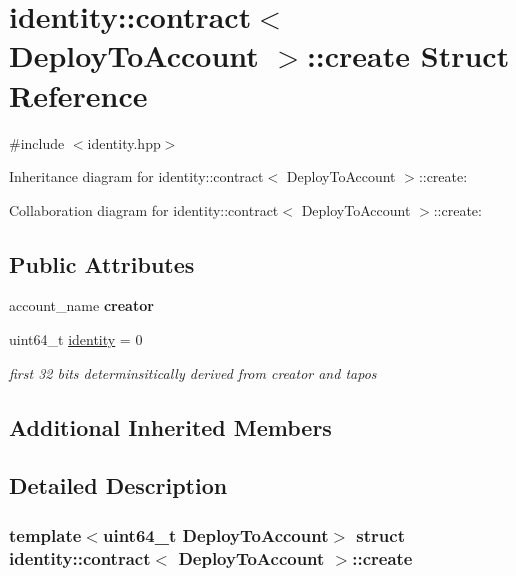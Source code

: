 \hypertarget{structidentity_1_1contract_1_1create}{}\section{identity\+:\+:contract$<$ Deploy\+To\+Account $>$\+:\+:create Struct Reference}
\label{structidentity_1_1contract_1_1create}


{\ttfamily \#include $<$identity.\+hpp$>$}



Inheritance diagram for identity\+:\+:contract$<$ Deploy\+To\+Account $>$\+:\+:create\+:


Collaboration diagram for identity\+:\+:contract$<$ Deploy\+To\+Account $>$\+:\+:create\+:
\subsection*{Public Attributes}
\begin{DoxyCompactItemize}
\item 
\mbox{\label{structidentity_1_1contract_1_1create_a7ab51fa09f57b794a8d08be27e3fba4e}} 
account\+\_\+name {\bfseries creator}
\item 
\mbox{\label{structidentity_1_1contract_1_1create_ad3eed7947aada76a30a9c9a3fe3b8c81}} 
uint64\+\_\+t \mbox{\hyperlink{structidentity_1_1contract_1_1create_ad3eed7947aada76a30a9c9a3fe3b8c81}{identity}} = 0
\begin{DoxyCompactList}\small\item\em first 32 bits determinsitically derived from creator and tapos \end{DoxyCompactList}\end{DoxyCompactItemize}
\subsection*{Additional Inherited Members}


\subsection{Detailed Description}
\subsubsection*{template$<$uint64\+\_\+t Deploy\+To\+Account$>$\newline
struct identity\+::contract$<$ Deploy\+To\+Account $>$\+::create}

